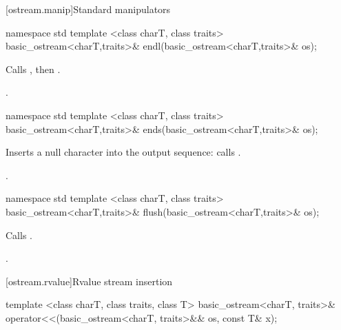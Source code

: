 [ostream.manip]{Standard  manipulators}

%
\begin{itemdecl}
namespace std {
  template <class charT, class traits>
    basic_ostream<charT,traits>& endl(basic_ostream<charT,traits>& os);
}
\end{itemdecl}

\begin{itemdescr}
\pnum
\effects
Calls
,
then
.

\pnum
\returns
{}.
\end{itemdescr}

%
\begin{itemdecl}
namespace std {
  template <class charT, class traits>
    basic_ostream<charT,traits>& ends(basic_ostream<charT,traits>& os);
}
\end{itemdecl}

\begin{itemdescr}
\pnum
\effects
Inserts a null character into the output sequence:
calls
.

\pnum
\returns
{}.
\end{itemdescr}

%
\begin{itemdecl}
namespace std {
  template <class charT, class traits>
    basic_ostream<charT,traits>& flush(basic_ostream<charT,traits>& os);
}
\end{itemdecl}

\begin{itemdescr}
\pnum
\effects
Calls
.

\pnum
\returns
{}.
\end{itemdescr}

[ostream.rvalue]{Rvalue stream insertion}

%
%
\begin{itemdecl}
template <class charT, class traits, class T>
  basic_ostream<charT, traits>&
  operator<<(basic_ostream<charT, traits>&& os, const T& x);
\end{itemdecl}

\begin{itemdescr}
\pnum
\effects {}

\pnum
\returns {}
\end{itemdescr}


